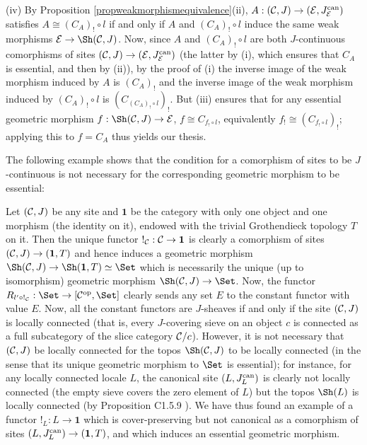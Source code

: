 \documentclass[a4paper,12pt]{article}
\begin{document}
\begin{proofs}
	(iv) By Proposition \ref{propweakmorphismequivalence}(ii), $A:({\cal C}, J) \to ({\cal E}, J^{\textup{can}}_{\cal E})$ satisfies $A\cong (C_{A})_{!}\circ l$ if and only if $A$ and $(C_{A})_{!}\circ l$ induce the same weak morphisms ${\cal E}\to \Sh({\cal C}, J)$. Now, since $A$ and $(C_{A})_{!}\circ l$ are both $J$-continuous comorphisms of sites $({\cal C}, J) \to ({\cal E}, J^{\textup{can}}_{\cal E})$ (the latter by (i), which ensures that $C_{A}$ is essential, and then by (ii)), by the proof of (i) the inverse image of the weak morphism induced by $A$ is $(C_{A})_{!}$ and the inverse image of the weak morphism induced by $(C_{A})_{!}\circ l$ is $(C_{(C_{A})_{!}\circ l})_{!}$. But (iii) ensures that for any essential geometric morphism $f:\Sh({\cal C}, J) \to {\cal E}$, $f\cong C_{f_{!}\circ l}$, equivalently $f_{!}\cong (C_{f_{!}\circ l})_{!}$; applying this to $f=C_{A}$ thus yields our thesis.  
\end{proofs}

The following example shows that the condition for a comorphism of sites to be $J$-continuous is not necessary for the corresponding geometric morphism to be essential:

\begin{example}
	Let $({\cal C}, J)$ be any site and $\textbf{1}$ be the category with only one object and one morphism (the identity on it), endowed with the trivial Grothendieck topology $T$ on it. Then the unique functor $!_{\cal C}:{\cal C}\to \textbf{1}$ is clearly a comorphism of sites $({\cal C}, J)\to (\textbf{1}, T)$ and hence induces a geometric morphism $\Sh({\cal C}, J)\to \Sh(\textbf{1}, T)\simeq \Set$ which is necessarily the unique (up to isomorphism) geometric morphism $\Sh({\cal C}, J)\to \Set$. Now, the functor $R_{l'\circ !_{\cal C}}:\Set \to [{\cal C}^{\textup{op}}, \Set]$ clearly sends any set $E$ to the constant functor with value $E$. Now, all the constant functors are $J$-sheaves if and only if the site $({\cal C}, J)$ is locally connected (that is, every $J$-covering sieve on an object $c$ is connected as a full subcategory of the slice category ${\cal C}\slash c$). However, it is not necessary that $({\cal C}, J)$ be locally connected for the topos $\Sh({\cal C}, J)$ to be locally connected (in the sense that its unique geometric morphism to $\Set$ is essential); for instance, for any locally connected locale $L$, the canonical site $(L, J_{L}^{\textup{can}})$ is clearly not locally connected (the empty sieve covers the zero element of $L$) but the topos $\Sh(L)$ is locally connected (by Proposition C1.5.9 \cite{El}). We have thus found an example of a functor $!_{L}:L\to \textbf{1}$ which is cover-preserving but not canonical as a comorphism of sites $(L, J_{L}^{\textup{can}})\to (\textbf{1}, T)$, and which induces an essential geometric morphism. 
\end{example}
\end{document}
